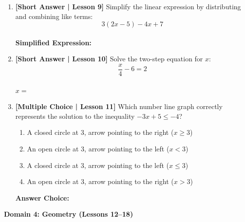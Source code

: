 \documentclass[12pt, letterpaper, fleqn]{article}
\newcommand{\blankshorter}{\underline{\hspace{2.0cm}}}
\newcommand{\blanklong}{\underline{\hspace{6.5cm}}}
\begin{document}
\begin{enumerate}[leftmargin=0.6cm, itemsep=\fill, start=8]

\item \textbf{[Short Answer | Lesson 9]} Simplify the linear expression by distributing and combining like terms:
$$3(2x - 5) - 4x + 7$$
\vspace{1.5cm} \\
\textbf{Simplified Expression:} \blanklong

\item \textbf{[Short Answer | Lesson 10]} Solve the two-step equation for $x$:
$$\frac{x}{4} - 6 = 2$$
\vspace{1.5cm} \\
\textbf{$x =$} \blanklong

\item \textbf{[Multiple Choice | Lesson 11]} Which number line graph correctly represents the solution to the inequality $-3x + 5 \leq -4$?
\begin{enumerate}[label=\Alph*)]
    \item A closed circle at $3$, arrow pointing to the right ($x \geq 3$)
    \item An open circle at $3$, arrow pointing to the left ($x < 3$)
    \item A closed circle at $3$, arrow pointing to the left ($x \leq 3$)
    \item An open circle at $3$, arrow pointing to the right ($x > 3$)
\end{enumerate}
\textbf{Answer Choice:} \blankshorter

\end{enumerate}

\vspace{0.5cm}

\begin{tcolorbox}[colback=white, colframe=black, arc=2mm]
    \textbf{Domain 4: Geometry (Lessons 12--18)}
\end{tcolorbox}
\end{document}
